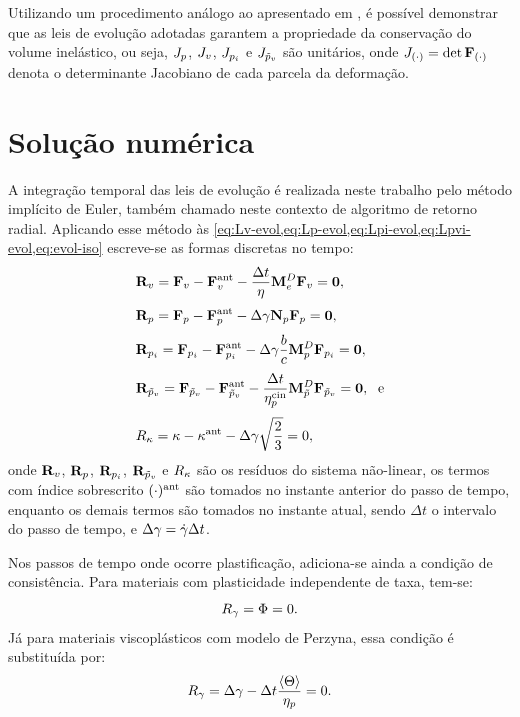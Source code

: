 \documentclass[Tese.tex]{subfiles}
\begin{document}
{Utilizando um procedimento análogo ao apresentado em , é possível demonstrar que as leis de evolução adotadas garantem a propriedade da conservação do volume inelástico, ou seja, $J_p$, $J_v$, $J_{p_i}$ e $J_{\tilde{p}_v}$ são unitários, onde $J_{(\cdot)}=\det\mathbf{F}_{(\cdot)}$ denota o determinante Jacobiano de cada parcela da deformação.

\section{Solução numérica}\label{sec:solucao-numerica}

A integração temporal das leis de evolução é realizada neste trabalho pelo método implícito de Euler, também chamado neste contexto de algoritmo de retorno radial. Aplicando esse método às \cref{eq:Lv-evol,eq:Lp-evol,eq:Lpi-evol,eq:Lpvi-evol,eq:evol-iso} escreve-se as formas discretas no tempo:
\begin{align}
& \mathbf{R}_v = \mathbf{F}_v-\mathbf{F}_v^\text{ant} - \dfrac{\Delta t}{\eta}\mathbf{M}_e^D\mathbf{F}_v = \mathbf{0}, \label{eq:evol-Fv-disc}\\[0.1cm]
& \mathbf{R}_p = \mathbf{F}_p - \mathbf{F}_p^\text{ant} - \Delta{\gamma}\mathbf{N}_p\mathbf{F}_p = \mathbf{0}, \label{eq:evol-Fp-disc}\\[0.1cm]
& \mathbf{R}_{p_i} = \mathbf{F}_{p_i} - \mathbf{F}_{p_i}^\text{ant} - \Delta{\gamma}\dfrac{b}{c}\mathbf{M}_p^D\mathbf{F}_{p_i} = \mathbf{0}, \label{eq:evol-Fpi-disc}  \\[0.1cm]
& \mathbf{R}_{\tilde{p}_v} = \mathbf{F}_{\tilde{p}_v} - \mathbf{F}_{\tilde{p}_v}^\text{ant} - \dfrac{\Delta t}{\eta_{p}^\text{cin}}\mathbf{M}_{\tilde{p}}^D\mathbf{F}_{\tilde{p}_v} = \mathbf{0}, \text{\; e}  \label{eq:evol-Fvi-disc} \\[0.1cm]
& R_{\kappa} = \kappa - \kappa^\text{ant} - \Delta{\gamma}\sqrt{\dfrac{2}{3}} = 0, \label{eq:evol-encruamento-disc}
\end{align}
onde $\mathbf{R}_v$, $\mathbf{R}_p$, $\mathbf{R}_{p_i}$, $\mathbf{R}_{\tilde{p}_v}$ e $R_{\kappa}$ são os resíduos do sistema não-linear, os termos com índice sobrescrito $(\cdot)^\text{ant}$ são tomados no instante anterior do passo de tempo, enquanto os demais termos são tomados no instante atual, sendo $\Delta t$ o intervalo do passo de tempo, e $\Delta{\gamma} = \dot{\gamma}\Delta t$.

Nos passos de tempo onde ocorre plastificação, adiciona-se ainda a condição de consistência. Para materiais com plasticidade independente de taxa, tem-se:
\begin{equation}\label{eq:comp1}
R_{\gamma} = \Phi = 0.
\end{equation}
Já para materiais viscoplásticos com modelo de Perzyna, essa condição é substituída por:
\begin{equation}\label{eq:comp2}
R_{\gamma} = \Delta{\gamma} - \Delta t\dfrac{\langle\Theta\rangle}{\eta_{p}} = 0.
\end{equation}


}
\end{document}
